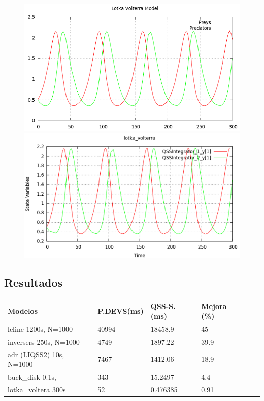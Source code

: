 \documentclass[a4paper,	11pt]{report}
\begin{document}
\begin{figure}[H]
\centering
\begin{minipage}{0.5\textwidth}
\centering
 \includegraphics[width=\linewidth]{lotka_voltera-pd}
\end{minipage}\hfill
\begin{minipage}{0.5\textwidth}
\centering
 \includegraphics[width=\linewidth]{lotka_voltera-qss}
\end{minipage}
\end{figure}

\subsection{Resultados}
\begin{table}[H]
\centering	
\label{my-label}
\begin{tabular}{llllll}
\toprule
{\bf Modelos}            &  {\bf P.DEVS(ms)} & {\bf QSS-S. (ms)} & {\bf Mejora (\%)} \\
\toprule
lcline 1200s, N=1000     & 40994         & 18458.9         & 45          \\
inversers 250s, N=1000   & 4749          & 1897.22         & 39.9        \\
adr (LIQSS2) 10s, N=1000 & 7467          & 1412.06         & 18.9        \\
buck\_disk  0.1s,        & 343           & 15.2497         & 4.4         \\
lotka\_voltera 300s      & 52            & 0.476385        & 0.91
\end{tabular}
\end{table}

\nocite{*}



\end{document}
